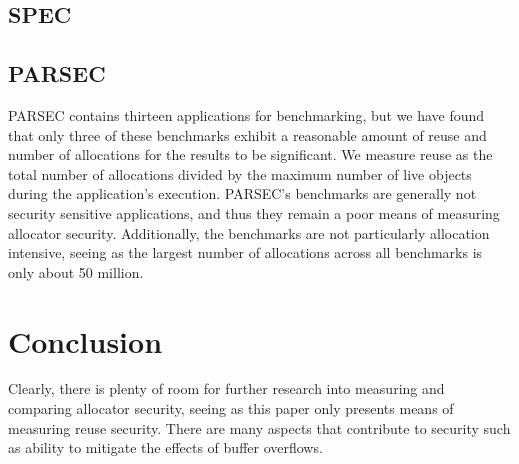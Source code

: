 \documentclass[11pt]{article}
\begin{document}
\begin{multicols*}{2}
\subsection{SPEC}

\subsection{PARSEC}

PARSEC contains thirteen applications for benchmarking, but we have found that only three of these benchmarks exhibit a reasonable amount of reuse and number of allocations for the results to be significant.
We measure reuse as the total number of allocations divided by the maximum number of live objects during the application's execution.
PARSEC's benchmarks are generally not security sensitive applications, and thus they remain a poor means of measuring allocator security.
Additionally, the benchmarks are not particularly allocation intensive, seeing as the largest number of allocations across all benchmarks is only about 50 million.

\section{Conclusion}

\noindent Clearly, there is plenty of room for further research into measuring and comparing allocator security, seeing as this paper only presents means of measuring reuse security. There are many aspects that contribute to security such as ability to mitigate the effects of buffer overflows.

\end{multicols*}
\end{document}
